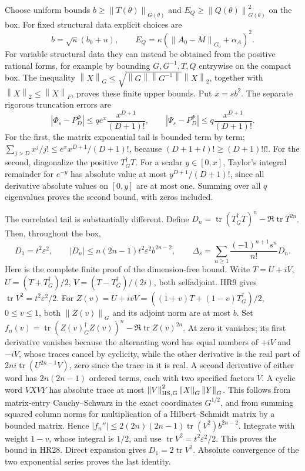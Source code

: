 \documentclass[11pt]{article}
\newcommand{\tr}{\operatorname{tr}}\newcommand{\dd}{\dagger_G}
\newcommand{\norm}[1]{\left\lVert#1\right\rVert}
\begin{document}
Choose uniform bounds \(b\ge\norm{T(\theta)}_{G(\theta)}\) and
\(E_Q\ge\norm{Q(\theta)}_{G(\theta)}^2\) on the box.
For fixed structural data explicit choices are
\begin{equation}\tag{HR26}\label{HR26}
b=\sqrt\kappa(b_0+u),\qquad
E_Q=\kappa(\norm{A_0-M}_{G_0}+\alpha_A)^2.
\end{equation}
For variable structural data they can instead be obtained from the
positive rational forms, for example by bounding \(G,G^{-1},T,Q\)
entrywise on the compact box. The inequality
\(\norm X_G\le\sqrt{\norm G\norm{G^{-1}}}\norm X_2\), together
with \(\norm X_2\le\norm X_F\), proves these finite upper bounds.
Put \(x=sb^2\). The separate rigorous truncation errors are
\begin{equation}\tag{HR27}\label{HR27}
|\Phi_s-P_D^\Phi|\le q e^x\frac{x^{D+1}}{(D+1)!},\qquad
|\Psi_s-P_D^\Psi|\le q\frac{x^{D+1}}{(D+1)!}.
\end{equation}
For the first, the matrix exponential tail is bounded term by term;
\(\sum_{j>D}x^j/j!\le e^x x^{D+1}/(D+1)!\), because
\((D+1+l)!\ge(D+1)!l!\). For the second, diagonalize the positive
\(T^\dd T\). For a scalar \(y\in[0,x]\), Taylor's integral remainder
for \(e^{-y}\) has absolute value at most \(y^{D+1}/(D+1)!\), since
all derivative absolute values on \([0,y]\) are at most one. Summing
over all \(q\) eigenvalues proves the second bound, with zeros included.

The correlated tail is substantially different. Define
\(D_n=\tr(T^\dd T)^n-\Re\tr T^{2n}\). Then, throughout the box,
\begin{equation}\tag{HR28}\label{HR28}
D_1=t^2\varepsilon^2,\qquad
|D_n|\le n(2n-1)t^2\varepsilon^2 b^{2n-2},\qquad
\Delta_s=\sum_{n\ge1}\frac{(-1)^{n+1}s^n}{n!}D_n.
\end{equation}
Here is the complete finite proof of the dimension-free bound. Write
\(T=U+iV\), \(U=(T+T^\dd)/2\), \(V=(T-T^\dd)/(2i)\), both
selfadjoint. HR9 gives \(\tr V^2=t^2\varepsilon^2/2\).
For \(Z(v)=U+ivV=((1+v)T+(1-v)T^\dd)/2\), \(0\le v\le1\),
both \(\norm{Z(v)}_G\) and its adjoint norm are at most \(b\).
Set \(f_n(v)=\tr(Z(v)^\dd Z(v))^n-\Re\tr Z(v)^{2n}\).
At zero it vanishes; its first derivative vanishes because the alternating
word has equal numbers of \(+iV\) and \(-iV\), whose traces cancel by
cyclicity, while the other derivative is the real part of
\(2ni\tr(U^{2n-1}V)\), zero since the trace in it is real.
A second derivative of either word has \(2n(2n-1)\) ordered terms,
each with two specified factors \(V\). A cyclic word \(VX VY\) has
absolute trace at most \(\norm V_{\rm HS,G}^2\norm X_G\norm Y_G\).
This follows from matrix-entry Cauchy--Schwarz in the exact coordinates
\(G^{1/2}\), and from summing squared column norms for multiplication
of a Hilbert--Schmidt matrix by a bounded matrix. Hence
\(|f_n''|\le2(2n)(2n-1)\tr(V^2)b^{2n-2}\).
Integrate with weight \(1-v\), whose integral is \(1/2\), and use
\(\tr V^2=t^2\varepsilon^2/2\). This proves the bound in HR28.
Direct expansion gives \(D_1=2\tr V^2\). Absolute convergence of the
two exponential series proves the last identity.
\end{document}
